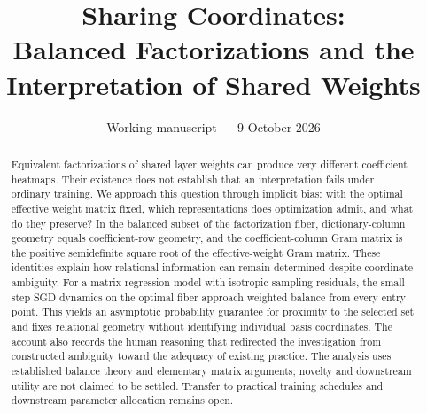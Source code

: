 \documentclass[11pt]{article}
\title{Sharing Coordinates:\\Balanced Factorizations and the Interpretation of Shared Weights}
\author{}
\date{Working manuscript --- 9 October 2026}
\begin{document}
\maketitle
\begin{abstract}
Equivalent factorizations of shared layer weights can produce very different coefficient heatmaps. Their existence does not establish that an interpretation fails under ordinary training. We approach this question through implicit bias: with the optimal effective weight matrix fixed, which representations does optimization admit, and what do they preserve? In the balanced subset of the factorization fiber, dictionary-column geometry equals coefficient-row geometry, and the coefficient-column Gram matrix is the positive semidefinite square root of the effective-weight Gram matrix. These identities explain how relational information can remain determined despite coordinate ambiguity. For a matrix regression model with isotropic sampling residuals, the small-step SGD dynamics on the optimal fiber approach weighted balance from every entry point. This yields an asymptotic probability guarantee for proximity to the selected set and fixes relational geometry without identifying individual basis coordinates. The account also records the human reasoning that redirected the investigation from constructed ambiguity toward the adequacy of existing practice. The analysis uses established balance theory and elementary matrix arguments; novelty and downstream utility are not claimed to be settled. Transfer to practical training schedules and downstream parameter allocation remains open.
\end{abstract}

\begingroup\small
\end{document}
